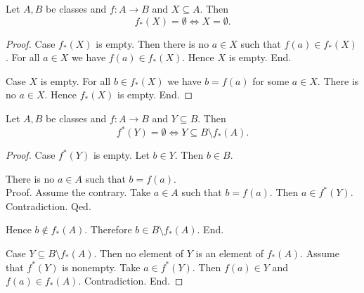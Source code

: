 \documentclass[../../set-theory/set-theory.tex]{subfiles}
\begin{document}
  \begin{forthel}
    \begin{proposition}
      Let $A, B$ be classes and $f : A \to B$ and $X \subseteq A$.
      Then \[ f_{*}(X) = \emptyset \iff X = \emptyset. \]
    \end{proposition}
    \begin{proof}
      Case $f_{*}(X)$ is empty.
        Then there is no $a \in X$ such that $f(a) \in f_{*}(X)$.
        For all $a \in X$ we have $f(a) \in f_{*}(X)$.
        Hence $X$ is empty.
      End.

      Case $X$ is empty.
        For all $b \in f_{*}(X)$ we have $b = f(a)$ for some $a \in X$.
        There is no $a \in X$.
        Hence $f_{*}(X)$ is empty.
      End.
    \end{proof}
  \end{forthel}

  \begin{forthel}
    \begin{proposition}
      Let $A, B$ be classes and $f : A \to B$ and $Y \subseteq B$.
      Then \[ f^{*}(Y) = \emptyset \iff Y \subseteq B \setminus f_{*}(A). \]
    \end{proposition}
    \begin{proof}
      Case $f^{*}(Y)$ is empty.
        Let $b \in Y$.
        Then $b \in B$.

        There is no $a \in A$ such that $b = f(a)$. \\
        Proof.
          Assume the contrary.
          Take $a \in A$ such that $b = f(a)$.
          Then $a \in f^{*}(Y)$.
          Contradiction.
        Qed.

        Hence $b \notin f_{*}(A)$.
        Therefore $b \in B \setminus f_{*}(A)$.
      End.

      Case $Y \subseteq B \setminus f_{*}(A)$.
        Then no element of $Y$ is an element of $f_{*}(A)$.
        Assume that $f^{*}(Y)$ is nonempty.
        Take $a \in f^{*}(Y)$.
        Then $f(a) \in Y$ and $f(a) \in f_{*}(A)$.
        Contradiction.
      End.
    \end{proof}
  \end{forthel}
\end{document}

